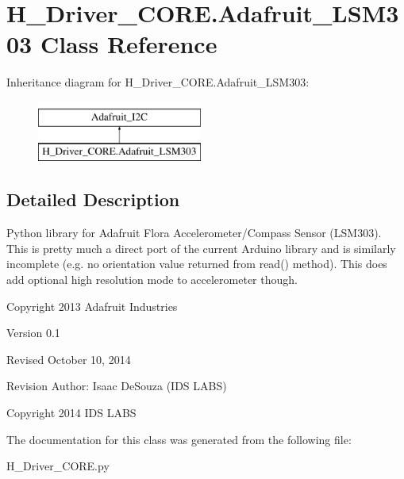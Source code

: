 \hypertarget{classH__Driver__CORE_1_1Adafruit__LSM303}{}\section{H\+\_\+\+Driver\+\_\+\+C\+O\+R\+E.\+Adafruit\+\_\+\+L\+S\+M303 Class Reference}
\label{classH__Driver__CORE_1_1Adafruit__LSM303}
Inheritance diagram for H\+\_\+\+Driver\+\_\+\+C\+O\+R\+E.\+Adafruit\+\_\+\+L\+S\+M303\+:\begin{figure}[H]
\begin{center}
\leavevmode
\includegraphics[height=2.000000cm]{classH__Driver__CORE_1_1Adafruit__LSM303}
\end{center}
\end{figure}


\subsection{Detailed Description}
\begin{DoxyVerb}Python library for Adafruit Flora Accelerometer/Compass Sensor (LSM303).
This is pretty much a direct port of the current Arduino library and is
similarly incomplete (e.g. no orientation value returned from read()
method).  This does add optional high resolution mode to accelerometer
though.

Copyright 2013 Adafruit Industries

Version 0.1

Revised October 10, 2014

Revision Author: Isaac DeSouza (IDS LABS)

Copyright 2014 IDS LABS
\end{DoxyVerb}
 

The documentation for this class was generated from the following file\+:\begin{DoxyCompactItemize}
\item 
H\+\_\+\+Driver\+\_\+\+C\+O\+R\+E.\+py\end{DoxyCompactItemize}
